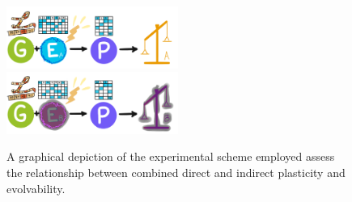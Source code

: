\begin{figure}
    \centering
    \includegraphics[width=0.5\textwidth]{img/combinedschemeA} \\
    \includegraphics[width=0.5\textwidth]{img/combinedschemeB}
  \caption{A graphical depiction of the experimental scheme employed assess the relationship between combined direct and indirect plasticity and evolvability.}
  \label{fig:combined_plasticity_scheme}
\end{figure}